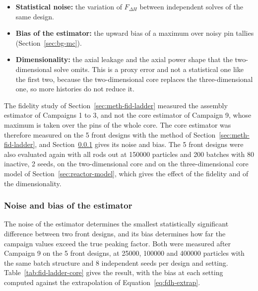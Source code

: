 \begin{itemize}
  \item \textbf{Statistical noise:} the variation of $F_{\Delta H}$
        between independent solves of the same design.
  \item \textbf{Bias of the estimator:} the upward bias of a maximum
        over noisy pin tallies (Section~\ref{sec:bg-mc}).
  \item \textbf{Dimensionality:} the axial leakage and the axial power
        shape that the two-dimensional solve omits. This is a proxy
        error and not a statistical one like the first two, because the
        two-dimensional core replaces the three-dimensional one, so more
        histories do not reduce it.
\end{itemize}

The fidelity study of Section~\ref{sec:meth-fid-ladder} measured the
assembly estimator of Campaigns 1 to 3, and not the core estimator of
Campaign 9, whose maximum is taken over the pins of the whole core. The
core estimator was therefore measured on the 5 front designs with the
method of Section~\ref{sec:meth-fid-ladder}, and
Section~\ref{sec:res-c9-peak-noise} gives its noise and bias. The 5
front designs were also evaluated again with all rods out at \num{150000} particles and 200 batches with 80
inactive, 2 seeds, on the two-dimensional core and on the
three-dimensional core model of Section~\ref{sec:reactor-model}, which
gives the effect of the fidelity and of the dimensionality.

\subsubsection{Noise and bias of the estimator}
\label{sec:res-c9-peak-noise}
The noise of the estimator determines the smallest statistically
significant difference between two front designs, and its bias
determines how far the campaign values exceed the true peaking factor.
Both were measured after Campaign 9 on the 5 front designs, at
\num{25000}, \num{100000} and \num{400000} particles with the same
batch structure and 8 independent seeds per design and setting.
Table~\ref{tab:fid-ladder-core} gives the result, with the bias at each
setting computed against the extrapolation of
Equation~\eqref{eq:fdh-extrap}.

